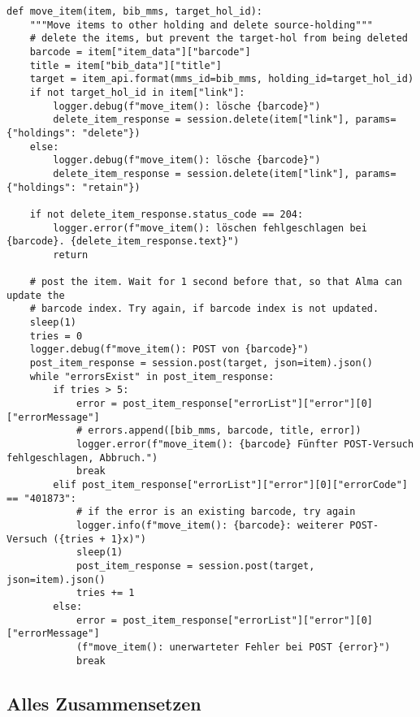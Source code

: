 \documentclass[10pt, a4paper]{scrartcl}
\begin{document}
\begin{verbatim}
def move_item(item, bib_mms, target_hol_id):
    """Move items to other holding and delete source-holding"""
    # delete the items, but prevent the target-hol from being deleted
    barcode = item["item_data"]["barcode"]
    title = item["bib_data"]["title"]
    target = item_api.format(mms_id=bib_mms, holding_id=target_hol_id)
    if not target_hol_id in item["link"]:
        logger.debug(f"move_item(): lösche {barcode}")
        delete_item_response = session.delete(item["link"], params={"holdings": "delete"})
    else:
        logger.debug(f"move_item(): lösche {barcode}")
        delete_item_response = session.delete(item["link"], params={"holdings": "retain"})

    if not delete_item_response.status_code == 204:
        logger.error(f"move_item(): löschen fehlgeschlagen bei {barcode}. {delete_item_response.text}")
        return

    # post the item. Wait for 1 second before that, so that Alma can update the
    # barcode index. Try again, if barcode index is not updated.
    sleep(1)
    tries = 0
    logger.debug(f"move_item(): POST von {barcode}")
    post_item_response = session.post(target, json=item).json()
    while "errorsExist" in post_item_response:
        if tries > 5:
            error = post_item_response["errorList"]["error"][0]["errorMessage"]
            # errors.append([bib_mms, barcode, title, error])
            logger.error(f"move_item(): {barcode} Fünfter POST-Versuch fehlgeschlagen, Abbruch.")
            break
        elif post_item_response["errorList"]["error"][0]["errorCode"] == "401873":
            # if the error is an existing barcode, try again
            logger.info(f"move_item(): {barcode}: weiterer POST-Versuch ({tries + 1}x)")
            sleep(1)
            post_item_response = session.post(target, json=item).json()
            tries += 1
        else:
            error = post_item_response["errorList"]["error"][0]["errorMessage"]
            (f"move_item(): unerwarteter Fehler bei POST {error}")
            break
\end{verbatim}

\subsection{Alles Zusammensetzen}
\label{sec:orgbc1c264}
\end{document}
